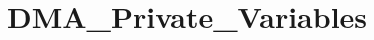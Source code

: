 \hypertarget{group___d_m_a___private___variables}{\section{D\-M\-A\-\_\-\-Private\-\_\-\-Variables}
\label{group___d_m_a___private___variables}
}
